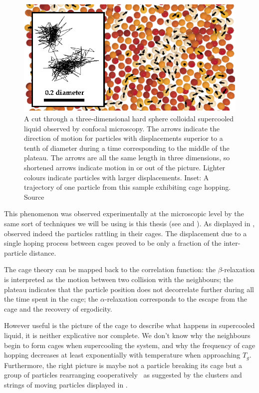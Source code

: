 \begin{figure}
	\centering
	\includegraphics[width=\textwidth]{cage_weeks}
	\caption{A cut through a three-dimensional hard sphere colloidal supercooled liquid observed by confocal microscopy. The arrows indicate the direction of motion for particles with displacements superior to a tenth of diameter during a time corresponding to the middle of the plateau. The arrows are all the same length in three dimensions, so shortened arrows indicate motion in or out of the picture. Lighter colours indicate particles with larger displacements. Inset: A trajectory of one particle from this sample exhibiting cage hopping. Source \citep{weeks2002pcr}}
	\label{fig:cage_weeks}
\end{figure}

This phenomenon was observed experimentally at the microscopic level by the same sort of techniques we will be using is this thesis (see  and ). As displayed in , \citet{weeks2002pcr} observed indeed the particles rattling in their cages. The displacement due to a single hoping process between cages proved to be only a fraction of the inter-particle distance.

The cage theory can be mapped back to the correlation function: the $\beta$-relaxation is interpreted as the motion between two collision with the neighbours; the plateau indicates that the particle position does not decorrelate further during all the time spent in the cage; the $\alpha$-relaxation corresponds to the escape from the cage and the recovery of ergodicity.

However useful is the picture of the cage to describe what happens in supercooled liquid, it is neither explicative nor complete. We don't know why the neighbours begin to form cages when supercooling the system, and why the frequency of cage hopping decreases at least exponentially with temperature when approaching $T_g$. Furthermore, the right picture is maybe not a particle breaking its cage but a group of particles rearranging cooperatively~\citep{Kob1997, Donati1998, Donati1999, kegel2000swe, Perera1999, weeks2000, weeks2002pcr} as suggested by the clusters and strings of moving particles displayed in .

